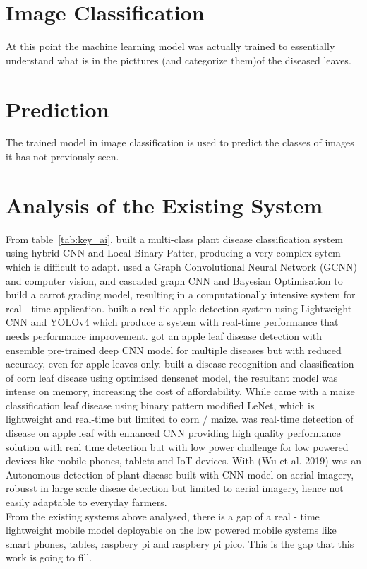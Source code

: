 \section{Image Classification}\sectionTitleBody
At this point the machine learning model was actually trained to essentially understand what is  in the picttures (and categorize them)of the diseased leaves.

\section{Prediction}\sectionTitleBody
The trained model in image classification is used to predict 
the classes of images it has not previously seen.

\section{Analysis of the Existing System}\sectionTitleBody
From table~\ref{tab:key_ai}, \citep{hosnyMultiClassClassificationPlant2023a} built a multi-class plant disease classification system using hybrid CNN and Local Binary Patter, producing a very complex sytem which is difficult to adapt. \cite{bukumiraCarrotGradingSystem2022a} used a Graph Convolutional Neural Network (GCNN) and computer vision, and cascaded graph CNN and Bayesian Optimisation to build a carrot grading model, resulting in a computationally intensive system for real - time application. \cite{khalidRealTimePlantHealth2023a} built a real-tie apple detection system using Lightweight - CNN and YOLOv4 which produce a system with real-time performance that needs performance improvement. \cite{bansalDiseaseDetectionApple2021} got an apple leaf disease detection with ensemble pre-trained deep CNN model for multiple diseases but with reduced accuracy, even for apple leaves only. 
\cite{waheedOptimizedDenseConvolutional2020a} built a disease recognition and classification of corn leaf disease using optimised densenet model, the resultant model was intense on memory, increasing the cost of affordability. While \cite{ahilaMaizeLeafDisease2019}  came with a maize classification leaf disease using binary pattern modified LeNet, which is lightweight and real-time but limited to corn / maize. \cite{jiangRealTimeDetectionApple2019a} was real-time detection of disease on apple leaf with enhanced CNN providing high quality performance solution  with real time detection but with low power challenge for low powered devices like mobile phones, tablets and IoT devices. With (Wu et al. 2019) was an Autonomous detection of plant disease built with CNN model on aerial imagery, robusst in large scale diseae detection but limited to aerial imagery, hence not easily adaptable to everyday farmers.\\
From the existing systems above analysed, there is a gap of a real - time lightweight mobile model deployable on the low powered mobile systems like smart phones, tables, raspbery pi and raspbery pi pico. This is the gap that this work is going to fill. 

